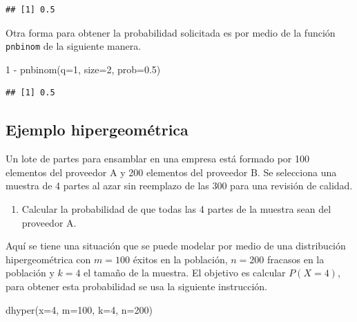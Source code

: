 \documentclass[
]{book}
\makeatletter
\newenvironment{Shaded}{\begin{snugshade}}{\end{snugshade}}
\newcommand{\AttributeTok}[1]{\textcolor[rgb]{0.77,0.63,0.00}{#1}}
\newcommand{\DecValTok}[1]{\textcolor[rgb]{0.00,0.00,0.81}{#1}}
\newcommand{\FloatTok}[1]{\textcolor[rgb]{0.00,0.00,0.81}{#1}}
\newcommand{\FunctionTok}[1]{\textcolor[rgb]{0.00,0.00,0.00}{#1}}
\newcommand{\NormalTok}[1]{#1}
\newcommand{\SpecialCharTok}[1]{\textcolor[rgb]{0.00,0.00,0.00}{#1}}
\providecommand{\tightlist}{%
  \setlength{\itemsep}{0pt}\setlength{\parskip}{0pt}}
\newenvironment{kframe}{%
\medskip{}
\setlength{\fboxsep}{.8em}
 \def\at@end@of@kframe{}%
 \ifinner\ifhmode%
  \def\at@end@of@kframe{\end{minipage}}%
  \begin{minipage}{\columnwidth}%
 \fi\fi%
 \def\FrameCommand##1{\hskip\@totalleftmargin \hskip-\fboxsep
 \colorbox{shadecolor}{##1}\hskip-\fboxsep
     \hskip-\linewidth \hskip-\@totalleftmargin \hskip\columnwidth}%
 \MakeFramed {\advance\hsize-\width
   \@totalleftmargin\z@ \linewidth\hsize
   \@setminipage}}%
 {\par\unskip\endMakeFramed%
 \at@end@of@kframe}
\renewenvironment{Shaded}{\begin{kframe}}{\end{kframe}}
\makeatother
\begin{document}
\begin{verbatim}
## [1] 0.5
\end{verbatim}

Otra forma para obtener la probabilidad solicitada es por medio de la función \texttt{pnbinom} de la siguiente manera.

\begin{Shaded}
\begin{Highlighting}[]
\DecValTok{1} \SpecialCharTok{{-}} \FunctionTok{pnbinom}\NormalTok{(}\AttributeTok{q=}\DecValTok{1}\NormalTok{, }\AttributeTok{size=}\DecValTok{2}\NormalTok{, }\AttributeTok{prob=}\FloatTok{0.5}\NormalTok{)}
\end{Highlighting}
\end{Shaded}

\begin{verbatim}
## [1] 0.5
\end{verbatim}

\hypertarget{ejemplo-hipergeomuxe9trica}{%
\subsection*{Ejemplo hipergeométrica}\label{ejemplo-hipergeomuxe9trica}}

Un lote de partes para ensamblar en una empresa está formado por 100 elementos del proveedor A y 200 elementos del proveedor B. Se selecciona una muestra de 4 partes al azar sin reemplazo de las 300 para una revisión de calidad.

\begin{enumerate}
\def\labelenumi{\arabic{enumi})}
\tightlist
\item
  Calcular la probabilidad de que todas las 4 partes de la muestra sean del proveedor A.
\end{enumerate}

Aquí se tiene una situación que se puede modelar por medio de una distribución hipergeométrica con \(m=100\) éxitos en la población, \(n=200\) fracasos en la población y \(k=4\) el tamaño de la muestra. El objetivo es calcular \(P(X=4)\), para obtener esta probabilidad se usa la siguiente instrucción.

\begin{Shaded}
\begin{Highlighting}[]
\FunctionTok{dhyper}\NormalTok{(}\AttributeTok{x=}\DecValTok{4}\NormalTok{, }\AttributeTok{m=}\DecValTok{100}\NormalTok{, }\AttributeTok{k=}\DecValTok{4}\NormalTok{, }\AttributeTok{n=}\DecValTok{200}\NormalTok{)}
\end{Highlighting}
\end{Shaded}
\end{document}

